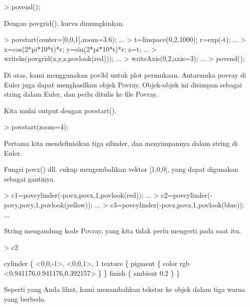 \documentclass[a4paper,10pt]{article}
\begin{document}
\begin{eulernotebook}
\begin{eulercomment}
\begin{eulercomment}
\begin{eulerprompt}
> povend();
\end{eulerprompt}
\begin{eulercomment}
Dengan povgrid(), kurva dimungkinkan.
\end{eulercomment}
\begin{eulerprompt}
> povstart(center=[0,0,1],zoom=3.6); ...
> t=linspace(0,2,1000); r=exp(-t); ...
> x=cos(2*pi*10*t)*r; y=sin(2*pi*10*t)*r; z=t; ...
> writeln(povgrid(x,y,z,povlook(red))); ...
> writeAxis(0,2,axis=3); ...
> povend();
\end{eulerprompt}
\begin{eulercomment}
Di atas, kami menggunakan pov3d untuk plot permukaan. Antarmuka povray
di Euler juga dapat menghasilkan objek Povray. Objek-objek ini
disimpan sebagai string dalam Euler, dan perlu ditulis ke file Povray.

Kita mulai output dengan povstart().
\end{eulercomment}
\begin{eulerprompt}
> povstart(zoom=4);
\end{eulerprompt}
\begin{eulercomment}
Pertama kita mendefinisikan tiga silinder, dan menyimpannya dalam
string di Euler.

Fungsi povx() dll. cukup mengembalikan vektor [1,0,0], yang dapat
digunakan sebagai gantinya.
\end{eulercomment}
\begin{eulerprompt}
> c1=povcylinder(-povx,povx,1,povlook(red)); ...
> c2=povcylinder(-povy,povy,1,povlook(yellow)); ...
> c3=povcylinder(-povz,povz,1,povlook(blue)); ...
\end{eulerprompt}
\begin{eulercomment}
String mengandung kode Povray, yang kita tidak perlu mengerti pada
saat itu.
\end{eulercomment}
\begin{eulerprompt}
> c2
\end{eulerprompt}
\begin{euleroutput}
  cylinder \{ <0,0,-1>, <0,0,1>, 1
   texture \{ pigment \{ color rgb <0.941176,0.941176,0.392157> \}  \} 
   finish \{ ambient 0.2 \} 
   \}
\end{euleroutput}
\begin{eulercomment}
Seperti yang Anda lihat, kami menambahkan tekstur ke objek dalam tiga
warna yang berbeda.


\end{eulercomment}
\end{eulercomment}
\end{eulercomment}
\end{eulernotebook}
\end{document}
